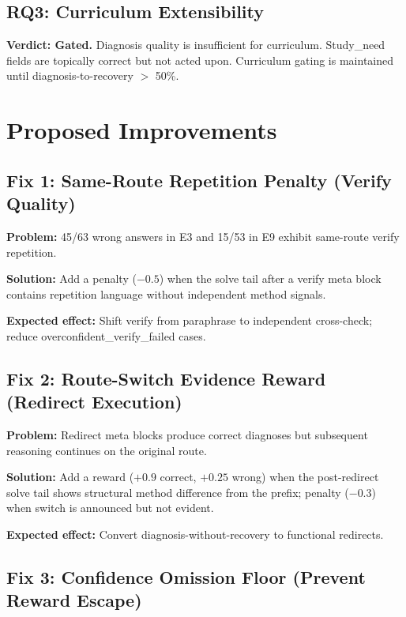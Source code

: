 \documentclass[11pt,a4paper]{article}
\begin{document}
\subsection{RQ3: Curriculum Extensibility}

\textbf{Verdict: Gated.} Diagnosis quality is insufficient for curriculum. Study\_need fields are topically correct but not acted upon. Curriculum gating is maintained until diagnosis-to-recovery $>$ 50\%.

\section{Proposed Improvements}

\subsection{Fix 1: Same-Route Repetition Penalty (Verify Quality)}

\textbf{Problem:} 45/63 wrong answers in E3 and 15/53 in E9 exhibit same-route verify repetition.

\textbf{Solution:} Add a penalty ($-0.5$) when the solve tail after a verify meta block contains repetition language without independent method signals.

\textbf{Expected effect:} Shift verify from paraphrase to independent cross-check; reduce overconfident\_verify\_failed cases.

\subsection{Fix 2: Route-Switch Evidence Reward (Redirect Execution)}

\textbf{Problem:} Redirect meta blocks produce correct diagnoses but subsequent reasoning continues on the original route.

\textbf{Solution:} Add a reward ($+0.9$ correct, $+0.25$ wrong) when the post-redirect solve tail shows structural method difference from the prefix; penalty ($-0.3$) when switch is announced but not evident.

\textbf{Expected effect:} Convert diagnosis-without-recovery to functional redirects.

\subsection{Fix 3: Confidence Omission Floor (Prevent Reward Escape)}
\end{document}
